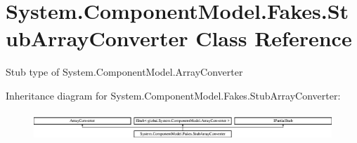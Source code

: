 \hypertarget{class_system_1_1_component_model_1_1_fakes_1_1_stub_array_converter}{\section{System.\-Component\-Model.\-Fakes.\-Stub\-Array\-Converter Class Reference}
\label{class_system_1_1_component_model_1_1_fakes_1_1_stub_array_converter}
}


Stub type of System.\-Component\-Model.\-Array\-Converter 


Inheritance diagram for System.\-Component\-Model.\-Fakes.\-Stub\-Array\-Converter\-:\begin{figure}[H]
\begin{center}
\leavevmode
\includegraphics[height=1.078998cm]{class_system_1_1_component_model_1_1_fakes_1_1_stub_array_converter}
\end{center}
\end{figure}
